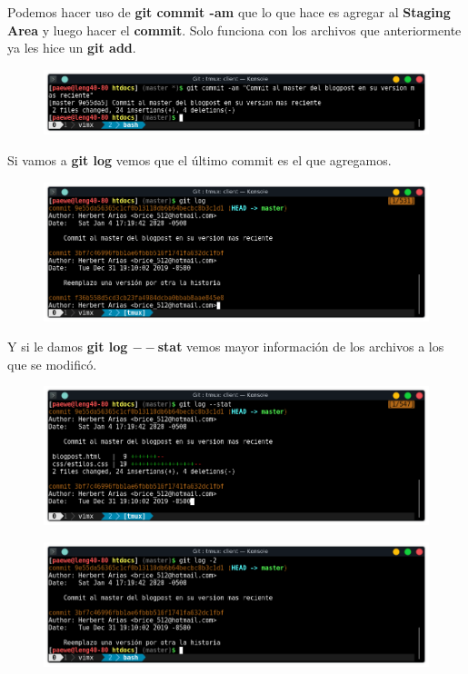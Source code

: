 \documentclass{article}
\begin{document}
Podemos hacer uso de \textbf{git commit -am} que lo que hace es agregar al
\textbf{Staging Area} y luego hacer el \textbf{commit}. Solo funciona con los
archivos que anteriormente ya les hice un \textbf{git add}.

\begin{figure}[h!]
  \centering
  \includegraphics[scale=0.75]{./Pictures/132_commit.png}
\end{figure}

Si vamos a \textbf{git log} vemos que el último commit es el que agregamos.

\begin{figure}[h!]
  \centering
  \includegraphics[scale=0.75]{./Pictures/133_log.png}
\end{figure}

Y si le damos \textbf{git log $--$stat} vemos mayor información de los archivos
a los que se modificó.

\begin{figure}[h!]
  \centering
  \includegraphics[scale=0.75]{./Pictures/134_log_stat.png}
\end{figure}

\begin{figure}[h!]
  \centering
  \includegraphics[scale=0.75]{./Pictures/135_log_2_lines.png}
\end{figure}
\end{document}
